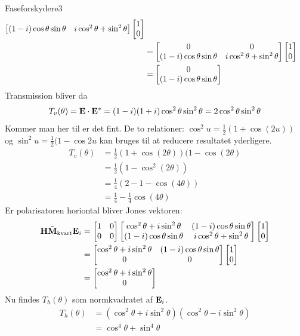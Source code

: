 \begin{opgave}{Faseforskydere}{3}
\begin{align*}
\begin{bmatrix}
(1-i)\cos\theta\sin\theta & i\cos^2\theta+\sin^2\theta
\end{bmatrix}\begin{bmatrix} 1 \\ 0 \end{bmatrix} 
\\
&=
\begin{bmatrix}
0&0\\
(1-i)\cos\theta\sin\theta & i\cos^2\theta+\sin^2\theta
\end{bmatrix}
\begin{bmatrix} 1 \\ 0 \end{bmatrix}\\
&=
\begin{bmatrix} 0 \\ (1-i)\cos\theta\sin\theta \end{bmatrix}
\end{align*}
Transmission bliver da 
\begin{equation}
T_v(\theta) = \mathbf{E}\cdot \mathbf{E}^* = (1-i)(1+i)\cos^2\theta\sin^2\theta = 2\cos^2\theta\sin^2\theta
\end{equation}
Kommer man her til er det fint.
De to relationer: $\cos^2u = \frac{1}{2}(1+\cos(2u))$ og $\sin^2 u = \frac{1}{2}(1-\cos 2u$ kan bruges til at reducere resultatet yderligere. 
\begin{align*}
T_v(\theta) &= \frac{1}{2}(1+\cos(2\theta))(1-\cos(2\theta)\\
&=\frac{1}{2}(1-\cos^2(2\theta))\\
&=\frac{1}{4}(2-1-\cos(4\theta))\\
&=\frac{1}{4}-\frac{1}{4}\cos(4\theta)
\end{align*}
Er polarisatoren horiontal bliver Jones vektoren:
\begin{align*}
\mathbf{H}\tilde{\mathbf{M}}_\text{kvart}\mathbf{E}_i &= \begin{bmatrix}
1&0\\0&0
\end{bmatrix}
\begin{bmatrix}
\cos^2 \theta+i\sin^2\theta&(1-i)\cos\theta\sin\theta\\
(1-i)\cos\theta\sin\theta & i\cos^2\theta+\sin^2\theta
\end{bmatrix}
\begin{bmatrix} 1 \\ 0 \end{bmatrix}
\\&=
\begin{bmatrix}
\cos^2 \theta+i\sin^2\theta&(1-i)\cos\theta\sin\theta\\
0&0
\end{bmatrix}
\begin{bmatrix} 1 \\ 0 \end{bmatrix}\\
&=
\begin{bmatrix} \cos^2\theta+i\sin^2\theta \\ 0 \end{bmatrix}
\end{align*}
Nu findes $T_h(\theta)$ som normkvadratet af $\mathbf{E}_i$.
\begin{align*}
T_h(\theta) &= (\cos^2\theta+i\sin^2\theta)(\cos^2\theta-i\sin^2\theta)
\\&=
\cos^4\theta+\sin^4\theta
\end{align*}

\end{opgave}
